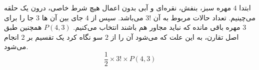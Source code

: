 ابتدا 
$4$
مهره سبز، بنفش، نقره‌ای و آبی بدون اعمال هیچ شرط خاصی، درون یک حلقه می‌چینیم. تعداد حالات مربوط به آن 
$3!$
 می‌باشد.
	\p
 سپس از
$4$
  جای بین آن ها 
$3$
   جا را برای 
$3$
    مهره باقی مانده که نباید مجاور هم باشند انتخاب می‌کنیم.
    \p
     \(P(4,3)\)
      همچنین طبق اصل تقارن، به این علت که می‌شود آن را از 
$2$
    سو نگاه کرد یک تقسیم بر 
$2$
     انجام می‌شود.
    \[\frac 1 2 \times3!\times P(4,3)\]